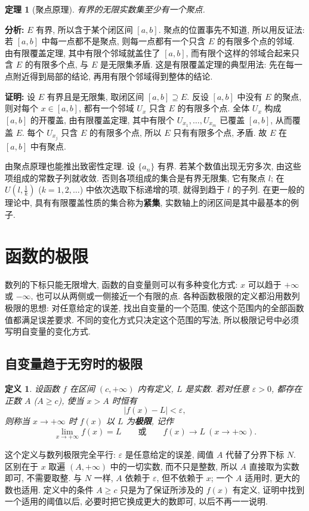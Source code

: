 \documentclass[UTF8,openany]{ctexbook}
\theoremstyle{chinesetextbook}
\newtheorem{definition}{定义}[section]
\newtheorem{theorem}{定理}[section]
\newenvironment{cnproof}{\par\indent\textbf{证明:} \ignorespaces}{\par}
\begin{document}
\begin{theorem}[聚点原理]
有界的无限实数集至少有一个聚点.
\end{theorem}
\par\indent\textbf{分析:} $E$ 有界, 所以含于某个闭区间 $[a,b]$. 聚点的位置事先不知道, 所以用反证法: 若 $[a,b]$ 中每一点都不是聚点, 则每一点都有一个只含 $E$ 的有限多个点的邻域. 由有限覆盖定理, 其中有限个邻域就盖住了 $[a,b]$, 而有限个这样的邻域合起来只含 $E$ 的有限多个点, 与 $E$ 是无限集矛盾. 这是有限覆盖定理的典型用法: 先在每一点附近得到局部的结论, 再用有限个邻域得到整体的结论.
\begin{cnproof}
设 $E$ 有界且是无限集, 取闭区间 $[a,b]\supseteq E$. 反设 $[a,b]$ 中没有 $E$ 的聚点, 则对每个 $x\in[a,b]$, 都有一个邻域 $U_x$ 只含 $E$ 的有限多个点. 全体 $U_x$ 构成 $[a,b]$ 的开覆盖, 由有限覆盖定理, 其中有限个 $U_{x_1},\ldots,U_{x_m}$ 已覆盖 $[a,b]$, 从而覆盖 $E$. 每个 $U_{x_j}$ 只含 $E$ 的有限多个点, 所以 $E$ 只有有限多个点, 矛盾. 故 $E$ 在 $[a,b]$ 中有聚点.
\end{cnproof}
由聚点原理也能推出致密性定理. 设 $\{a_n\}$ 有界. 若某个数值出现无穷多次, 由这些项组成的常数子列就收敛. 否则各项组成的集合是有界无限集, 它有聚点 $l$; 在 $\displaystyle U\left(l,\frac1k\right)$ ($k=1,2,\ldots$) 中依次选取下标递增的项, 就得到趋于 $l$ 的子列. 在更一般的理论中, 具有有限覆盖性质的集合称为\textbf{紧集}, 实数轴上的闭区间是其中最基本的例子.
\section{函数的极限}
数列的下标只能无限增大, 函数的自变量则可以有多种变化方式: $x$ 可以趋于 $+\infty$ 或 $-\infty$, 也可以从两侧或一侧接近一个有限的点. 各种函数极限的定义都沿用数列极限的思想: 对任意给定的误差, 找出自变量的一个范围, 使这个范围内的全部函数值都满足误差要求. 不同的变化方式只决定这个范围的写法, 所以极限记号中必须写明自变量的变化方式.
\subsection{自变量趋于无穷时的极限}
\begin{definition}
设函数 $f$ 在区间 $(c,+\infty)$ 内有定义, $L$ 是实数. 若对任意 $\varepsilon>0$, 都存在正数 $A$ ($A\ge c$), 使当 $x>A$ 时恒有
\[
|f(x)-L|<\varepsilon,
\]
则称当 $x\to+\infty$ 时 $f(x)$ 以 $L$ 为\textbf{极限}, 记作
\[
\lim_{x\to+\infty}f(x)=L\qquad\text{或}\qquad f(x)\to L\ (x\to+\infty).
\]
\end{definition}
这个定义与数列极限完全平行: $\varepsilon$ 是任意给定的误差, 阈值 $A$ 代替了分界下标 $N$. 区别在于 $x$ 取遍 $(A,+\infty)$ 中的一切实数, 而不只是整数, 所以 $A$ 直接取为实数即可, 不需要取整. 与 $N$ 一样, $A$ 依赖于 $\varepsilon$, 但不依赖于 $x$; 一个 $A$ 适用时, 更大的数也适用. 定义中的条件 $A\ge c$ 只是为了保证所涉及的 $f(x)$ 有定义, 证明中找到一个适用的阈值以后, 必要时把它换成更大的数即可, 以后不再一一说明.
\end{document}

